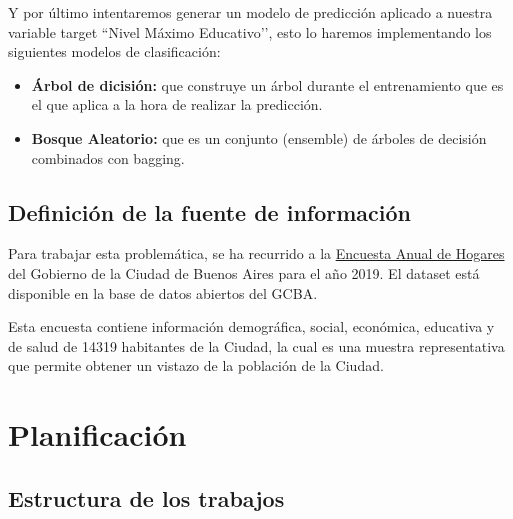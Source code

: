 \documentclass[a4paper]{article}
\begin{document}

        Y por último intentaremos generar un modelo de predicción aplicado a nuestra variable target ``Nivel Máximo Educativo’’, esto lo haremos implementando los siguientes modelos de clasificación:
        \begin{itemize}
            \item \textbf{Árbol de dicisión:} que construye un árbol durante el entrenamiento que es el que aplica a la hora de realizar la predicción.
            \item \textbf{Bosque Aleatorio:} que es un conjunto (ensemble) de árboles de decisión combinados con bagging.
        \end{itemize}

    \subsection{Definición de la fuente de información}

        Para trabajar esta problemática, se ha recurrido a la \href{https://data.buenosaires.gob.ar/dataset/encuesta-anual-hogares/resource/3a45c563-396d-42de-ba93-8a93729e0723}{Encuesta Anual de Hogares} del Gobierno de la Ciudad de Buenos Aires para el año 2019. El dataset está disponible en la base de datos abiertos del GCBA.

        Esta encuesta contiene información demográfica, social, económica, educativa y de salud de 14319 habitantes de la Ciudad, la cual es una muestra representativa que permite obtener un vistazo de la población de la Ciudad.


\newpage

\section{Planificación}

    \subsection*{Estructura de los trabajos}
\end{document}
